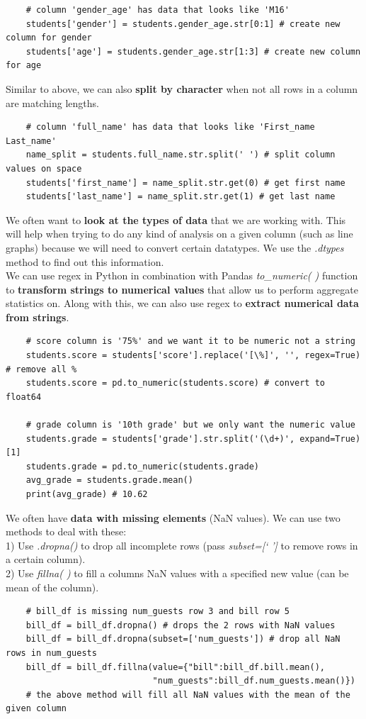 \documentclass[11pt, a4paper]{article}
\begin{document}
\begin{spacing}{1.1}
	\begin{lstlisting}
	# column 'gender_age' has data that looks like 'M16'
	students['gender'] = students.gender_age.str[0:1] # create new column for gender
	students['age'] = students.gender_age.str[1:3] # create new column for age \end{lstlisting}\vspace*{1mm}
	Similar to above, we can also \textbf{split by character} when not all rows in a column are matching lengths.
	\begin{lstlisting}
	# column 'full_name' has data that looks like 'First_name Last_name'
	name_split = students.full_name.str.split(' ') # split column values on space
	students['first_name'] = name_split.str.get(0) # get first name
	students['last_name'] = name_split.str.get(1) # get last name \end{lstlisting} \newpage
	
	\noindent We often want to \textbf{look at the types of data} that we are working with. This will help when trying to do any kind of analysis on a given column (such as line graphs) because we will need to convert certain datatypes. We use the \textit{.dtypes} method to find out this information. \vspace*{1.5mm} \\
	We can use regex in Python in combination with Pandas \textit{to\_numeric( )} function to \textbf{transform strings to numerical values} that allow us to perform aggregate statistics on. Along with this, we can also use regex to \textbf{extract numerical data from strings}.
	\begin{lstlisting}
	# score column is '75%' and we want it to be numeric not a string
	students.score = students['score'].replace('[\%]', '', regex=True) # remove all %
	students.score = pd.to_numeric(students.score) # convert to float64	
	
	# grade column is '10th grade' but we only want the numeric value
	students.grade = students['grade'].str.split('(\d+)', expand=True)[1]
	students.grade = pd.to_numeric(students.grade)
	avg_grade = students.grade.mean()
	print(avg_grade) # 10.62 \end{lstlisting}\vspace*{1mm}
	We often have \textbf{data with missing elements} (NaN values). We can use two methods to deal with these: \\
	1) Use \textit{.dropna()} to drop all incomplete rows (pass \textit{subset=[` ']} to remove rows in a certain column). \\
	2) Use \textit{fillna( )} to fill a columns NaN values with a specified new value (can be mean of the column).
	\begin{lstlisting}
	# bill_df is missing num_guests row 3 and bill row 5
	bill_df = bill_df.dropna() # drops the 2 rows with NaN values
	bill_df = bill_df.dropna(subset=['num_guests']) # drop all NaN rows in num_guests
	bill_df = bill_df.fillna(value={"bill":bill_df.bill.mean(), 
	                         "num_guests":bill_df.num_guests.mean()})
	# the above method will fill all NaN values with the mean of the given column \end{lstlisting}\vspace*{1mm}
	

\end{spacing}
\end{document}
